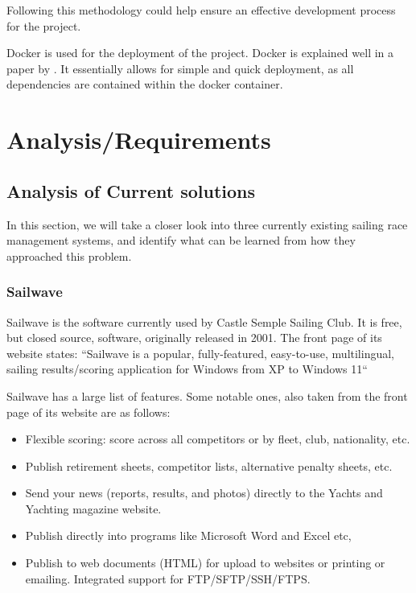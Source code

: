 \documentclass{l4proj}
\begin{document}
Following this methodology could help ensure an effective development process for the project.

Docker is used for the deployment of the project. Docker is explained well in a paper by \citet{docker}. It essentially allows for simple and quick deployment, as all dependencies are contained within the docker container.




\chapter{Analysis/Requirements}\label{chap:A/R}
\section{Analysis of Current solutions}
In this section, we will take a closer look into three currently existing sailing race management systems, and identify what can be learned from how they approached this problem.
\subsection{Sailwave}
Sailwave \citet{sailwave} is the software currently used by Castle Semple Sailing Club. It is free, but closed source, software, originally released in 2001.
The front page of its website \citep{sailwave} states: “Sailwave is a popular, fully-featured, easy-to-use, multilingual, sailing results/scoring application for Windows from XP to Windows 11“

Sailwave has a large list of features. Some notable ones, also taken from the front page of its website \citep{sailwave} are as follows:
\begin{itemize}
    \item
    Flexible scoring: score across all competitors or by fleet, club, nationality, etc.
    \item
    Publish retirement sheets, competitor lists, alternative penalty sheets, etc.
    \item
    Send your news (reports, results, and photos) directly to the Yachts and Yachting magazine website.
    \item
    Publish directly into programs like Microsoft Word and Excel etc,
    \item
    Publish to web documents (HTML) for upload to websites or printing or emailing. Integrated support for FTP/SFTP/SSH/FTPS.
\end{itemize}
\end{document}
